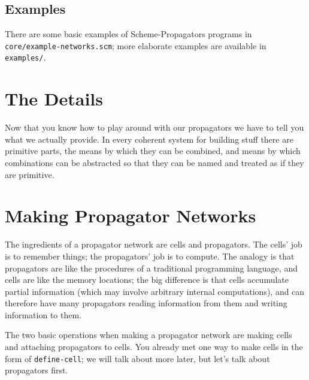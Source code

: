 \documentclass[12pt,letterpaper,english]{article}
\begin{document}

\hypertarget{examples}{}
\subsection{Examples}
\label{examples}

There are some basic examples of Scheme-Propagators programs in
\texttt{core/example-networks.scm}; more elaborate examples are available
in \texttt{examples/}.



\hypertarget{the-details}{}
\section{The Details}
\label{the-details}

Now that you know how to play around with our propagators we have to
tell you what we actually provide.  In every coherent system for
building stuff there are primitive parts, the means by which they can
be combined, and means by which combinations can be abstracted so that
they can be named and treated as if they are primitive.



\hypertarget{making-propagator-networks}{}
\section{Making Propagator Networks}
\label{making-propagator-networks}

The ingredients of a propagator network are cells and propagators.
The cells' job is to remember things; the propagators' job is to
compute.  The analogy is that propagators are like the procedures of a
traditional programming language, and cells are like the memory
locations; the big difference is that cells accumulate partial
information (which may involve arbitrary internal computations), and
can therefore have many propagators reading information from them and
writing information to them.

The two basic operations when making a propagator network are making
cells and attaching propagators to cells.  You already met one way to
make cells in the form of \texttt{define-cell}; we will talk about more
later, but let's talk about propagators first.
\end{document}
